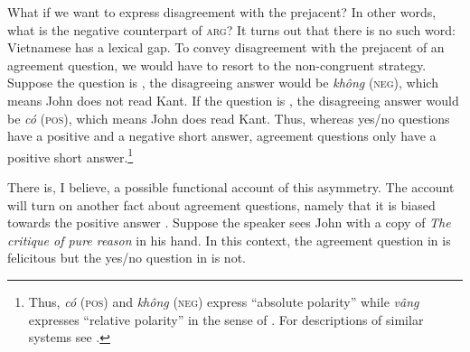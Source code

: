 \documentclass[output=paper,colorlinks,citecolor=brown]{langscibook}
\begin{document}

What if we want to express disagreement with the prejacent? In other words, what is the negative counterpart of \textsc{arg}? It turns out that there is no such word: Vietnamese has a lexical gap. To convey disagreement with the prejacent of an agreement question, we would have to resort to the non-congruent strategy. Suppose the question is , the disagreeing answer would be \textit{không} (\textsc{neg}), which means John does not read Kant. If the question is , the disagreeing answer would be \textit{có} (\textsc{pos}), which means John does read Kant.   %
Thus, whereas yes/no questions have a positive and a negative short answer, agreement questions only have a positive short answer.\footnote{Thus, \textit{có} (\textsc{pos}) and \textit{không} (\textsc{neg}) express ``absolute polarity'' while \textit{vâng} expresses ``relative polarity''  in the sense of \citet{roelofsen2015polarity}. For descriptions of similar systems see \citet{holmberg2016syntax, maldonado2023you}.}%

There is, I believe, a possible functional account of this asymmetry. The account will turn on another fact about agreement questions, namely that it is biased towards the positive answer \citep{trinh2010asking}. Suppose the speaker sees John with a copy of \textit{The critique of pure reason} in his hand. In this context, the agreement question in  is felicitous but the yes/no question in  is not.
 
\end{document}
